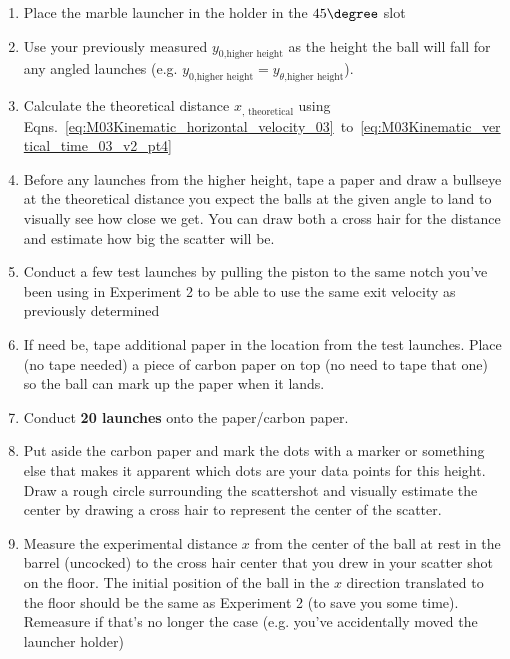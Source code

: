\begin{enumerate}
\item Place the marble launcher in the holder in the $45\degree$ slot
\item Use your previously measured $y_{0\text{,higher height}}$ as the height the ball will fall for any angled launches (e.g. $y_{0\text{,higher height}} = y_{\theta\text{,higher height}}$).
\item \label{M03_launchStepStart_exp3} Calculate the theoretical distance $x_{\text{, theoretical}}$ using Eqns.~\ref{eq:M03Kinematic_horizontal_velocity_03}~to~\ref{eq:M03Kinematic_vertical_time_03_v2_pt4}
\item Before any launches from the higher height, tape a paper and draw a bullseye at the theoretical distance you expect the balls at the given angle to land to visually see how close we get. You can draw both a cross hair for the distance and estimate how big the scatter will be.
\item Conduct a few test launches by pulling the piston to the same notch you've been using in Experiment 2 to be able to use the same exit velocity as previously determined
\item If need be, tape additional paper in the location from the test launches. Place (no tape needed) a piece of carbon paper on top (no need to tape that one) so the ball can mark up the paper when it lands.
\item Conduct \textbf{20 launches} onto the paper/carbon paper.
\item Put aside the carbon paper and mark the dots with a marker or something else that makes it apparent which dots are your data points for this height. Draw a rough circle surrounding the scattershot and visually estimate the center by drawing a cross hair to represent the center of the scatter.
\item Measure the experimental distance $x$ from the center of the ball at rest in the barrel (uncocked) to the cross hair center that you drew in your scatter shot on the floor. The initial position of the ball in the $x$ direction translated to the floor should be the same as Experiment 2 (to save you some time). Remeasure if that's no longer the case (e.g. you've accidentally moved the launcher holder)

\end{enumerate}
